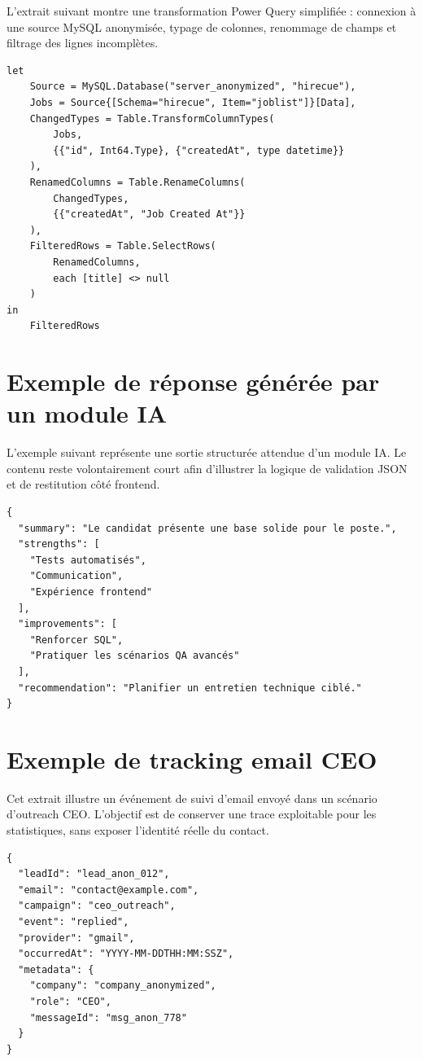 L'extrait suivant montre une transformation Power Query simplifiée : connexion à une source MySQL anonymisée, typage de colonnes, renommage de champs et filtrage des lignes incomplètes.

\begin{verbatim}
let
    Source = MySQL.Database("server_anonymized", "hirecue"),
    Jobs = Source{[Schema="hirecue", Item="joblist"]}[Data],
    ChangedTypes = Table.TransformColumnTypes(
        Jobs,
        {{"id", Int64.Type}, {"createdAt", type datetime}}
    ),
    RenamedColumns = Table.RenameColumns(
        ChangedTypes,
        {{"createdAt", "Job Created At"}}
    ),
    FilteredRows = Table.SelectRows(
        RenamedColumns,
        each [title] <> null
    )
in
    FilteredRows
\end{verbatim}

\section{Exemple de réponse générée par un module IA}

L'exemple suivant représente une sortie structurée attendue d'un module IA. Le contenu reste volontairement court afin d'illustrer la logique de validation JSON et de restitution côté frontend.

\begin{verbatim}
{
  "summary": "Le candidat présente une base solide pour le poste.",
  "strengths": [
    "Tests automatisés",
    "Communication",
    "Expérience frontend"
  ],
  "improvements": [
    "Renforcer SQL",
    "Pratiquer les scénarios QA avancés"
  ],
  "recommendation": "Planifier un entretien technique ciblé."
}
\end{verbatim}

\section{Exemple de tracking email CEO}

Cet extrait illustre un événement de suivi d'email envoyé dans un scénario d'outreach CEO. L'objectif est de conserver une trace exploitable pour les statistiques, sans exposer l'identité réelle du contact.

\begin{verbatim}
{
  "leadId": "lead_anon_012",
  "email": "contact@example.com",
  "campaign": "ceo_outreach",
  "event": "replied",
  "provider": "gmail",
  "occurredAt": "YYYY-MM-DDTHH:MM:SSZ",
  "metadata": {
    "company": "company_anonymized",
    "role": "CEO",
    "messageId": "msg_anon_778"
  }
}
\end{verbatim}

